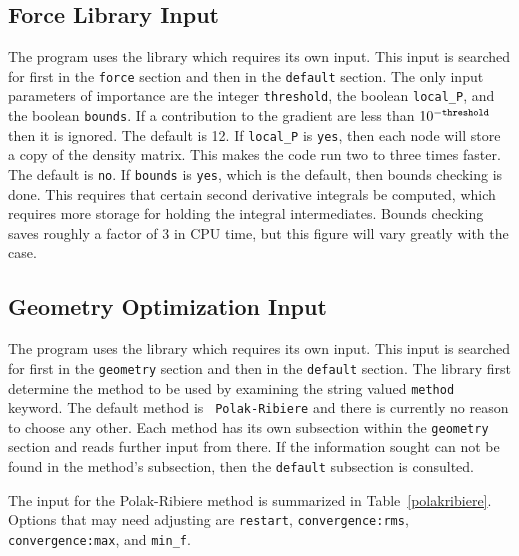 \subsection{Force Library Input}
The \mpqc{} program uses the \libforce{} library which requires its own
input.  This input
is searched for first in the {\tt force}
section and then in the {\tt default} section.  The only input parameters
of importance are the integer {\tt threshold}, the boolean
{\tt local\_P}, and the boolean {\tt bounds}.
If a contribution to the gradient are less than
$10^{-{\tt threshold}}$ then it is ignored.  The default is 12.  If
{\tt local\_P} is {\tt yes}, then each node will store a copy of the
density matrix.  This makes the code run two to three times faster.
The default is {\tt no}.  If {\tt bounds} is {\tt yes}, which is the
default, then bounds checking is done.  This requires that certain
second derivative integrals be computed, which requires more storage
for holding the integral intermediates.  Bounds checking saves roughly
a factor of 3 in CPU time, but this figure will vary greatly with the
case.

\subsection{Geometry Optimization Input}
The \mpqc{} program uses the \libgeom{} library which requires its own
input.  This input
is searched for first in the {\tt geometry}
section and then in the {\tt default} section.
The \libgeom{} library first determine the method to be used by examining
the string valued {\tt method} keyword.  The default method is {\tt
Polak-Ribiere} and there is currently no reason to choose any other.
Each method has its own subsection within the {\tt geometry} section and
reads further input from there.  If the information sought can not be found
in the method's subsection, then the {\tt default} subsection is consulted.

The input for the Polak-Ribiere method is summarized in
Table~\ref{polakribiere}.  Options that may need adjusting are
{\tt restart}, {\tt convergence:rms}, {\tt convergence:max}, and
{\tt min\_f}.

